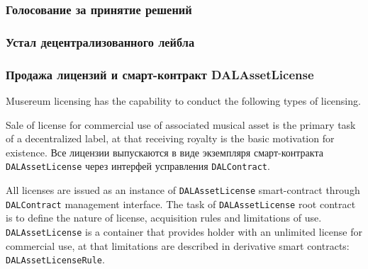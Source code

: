 \documentclass[12pt]{report}
\newcommand{\hlc}[1]{\colorbox{yellow!25}{#1}}
\def\code#1{\colorbox{light-gray}{\texttt{#1}}}
\begin{document}
\subsubsection{Голосование за принятие решений}
\label{tech-apps-dal-voting}
\subsubsection{Устал децентрализованного лейбла}
\label{tech-apps-dal-charter}
\subsubsection{Продажа лицензий и смарт-контракт DALAssetLicense}
\label{tech-apps-dal-license}

Musereum licensing has the capability to conduct the following types of licensing.

Sale of license for commercial use of associated musical asset is the primary task of a decentralized label, at that receiving royalty is the basic motivation for existence.
Все лицензии выпускаются в виде экземпляря смарт-контракта \code{DALAssetLicense} через интерфей усправления \code{DALContract}. 

All licenses are issued as \hlc{an instance} of \code{DALAssetLicense} smart-contract through \code{DALContract} management interface.
The task of \code{DALAssetLicense} root contract is to define the nature of license, acquisition rules and  limitations of use. \code{DALAssetLicense} is a container that provides holder with an unlimited license for commercial use, at that limitations are described in derivative smart contracts:
 \code{DALAssetLicenseRule}.
\end{document}
